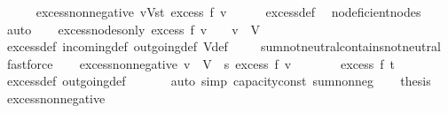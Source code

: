 \begin{isabellebody}
%
\isadelimproof
\isanewline
%
\endisadelimproof
\isanewline
\ \ \ \ \isanewline
{}\isamarkupfalse%
\ excess{\isacharunderscore}non{\isacharunderscore}negative{\isacharcolon}\ {\isachardoublequoteopen}{\isasymforall}v{\isasymin}V{\isacharminus}{\isacharbraceleft}s{\isacharcomma}t{\isacharbraceright}{\isachardot}\ excess\ f\ v\ {\isasymge}\ {}{\isachardoublequoteclose}\isanewline
%
\isadelimproof
\ \ %
\endisadelimproof
%
\isatagproof
{}\isamarkupfalse%
\ excess{\isacharunderscore}def\ \isamarkupfalse%
\ no{\isacharunderscore}deficient{\isacharunderscore}nodes\ \isamarkupfalse%
\ auto%
\endisatagproof
{\isafoldproof}%
%
\isadelimproof
\isanewline
%
\endisadelimproof
\ \ \isanewline
{}\isamarkupfalse%
\ excess{\isacharunderscore}nodes{\isacharunderscore}only{\isacharcolon}\ {\isachardoublequoteopen}excess\ f\ v\ {\isachargreater}\ {}\ {\isasymLongrightarrow}\ v\ {\isasymin}\ V{\isachardoublequoteclose}\ \ \isanewline
%
\isadelimproof
\ \ %
\endisadelimproof
%
\isatagproof
{}\isamarkupfalse%
\ excess{\isacharunderscore}def\ incoming{\isacharunderscore}def\ outgoing{\isacharunderscore}def\ V{\isacharunderscore}def\ \isanewline
\ \ \isamarkupfalse%
\ sum{\isachardot}not{\isacharunderscore}neutral{\isacharunderscore}contains{\isacharunderscore}not{\isacharunderscore}neutral\ \isamarkupfalse%
\ fastforce%
\endisatagproof
{\isafoldproof}%
%
\isadelimproof
\isanewline
%
\endisadelimproof
\ \ \isanewline
{}\isamarkupfalse%
\ excess{\isacharunderscore}non{\isacharunderscore}negative{\isacharprime}{\isacharcolon}\ {\isachardoublequoteopen}{\isasymforall}v\ {\isasymin}\ V\ {\isacharminus}\ {\isacharbraceleft}s{\isacharbraceright}{\isachardot}\ excess\ f\ v\ {\isasymge}\ {}{\isachardoublequoteclose}\isanewline
%
\isadelimproof
%
\endisadelimproof
%
\isatagproof
{}\isamarkupfalse%
\ {\isacharminus}\isanewline
\ \ \isamarkupfalse%
\ {\isachardoublequoteopen}excess\ f\ t\ {\isasymge}\ {}{\isachardoublequoteclose}\ \isamarkupfalse%
\ excess{\isacharunderscore}def\ outgoing{\isacharunderscore}def\ \isanewline
\ \ \ \ \isamarkupfalse%
\ {\isacharparenleft}auto\ simp{\isacharcolon}\ capacity{\isacharunderscore}const\ sum{\isacharunderscore}nonneg{\isacharparenright}\isanewline
\ \ \isamarkupfalse%
\ {\isacharquery}thesis\ \isamarkupfalse%
\ excess{\isacharunderscore}non{\isacharunderscore}negative\ \isamarkupfalse%

\end{isabellebody}
